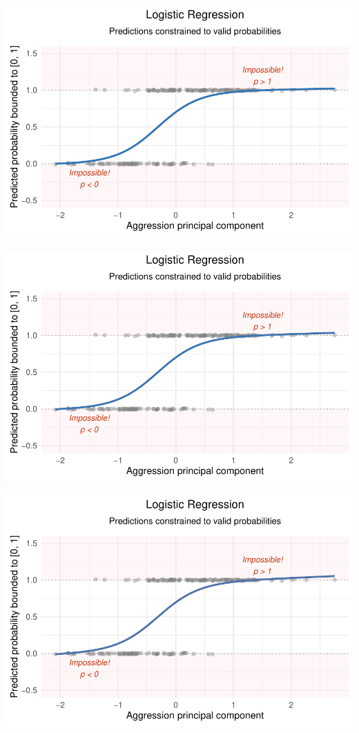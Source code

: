 \documentclass[
  letterpaper,
  DIV=11,
  numbers=noendperiod]{scrartcl}
\begin{document}
\begin{center}
\includegraphics[width=0.8\linewidth,height=\textheight,keepaspectratio]{Beyond!!!_files/figure-pdf/unnamed-chunk-4-78.pdf}
\end{center}

\begin{center}
\includegraphics[width=0.8\linewidth,height=\textheight,keepaspectratio]{Beyond!!!_files/figure-pdf/unnamed-chunk-4-79.pdf}
\end{center}

\begin{center}
\includegraphics[width=0.8\linewidth,height=\textheight,keepaspectratio]{Beyond!!!_files/figure-pdf/unnamed-chunk-4-80.pdf}
\end{center}
\end{document}
